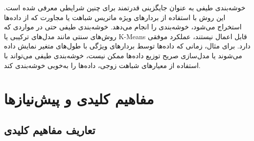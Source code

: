 \documentclass[a4paper,12pt,openany]{report}
\begin{document}
	خوشه‌بندی طیفی به عنوان جایگزینی قدرتمند برای چنین شرایطی معرفی شده است. این روش با استفاده از بردارهای ویژه ماتریس شباهت یا مجاورت که از داده‌ها استخراج می‌شود، خوشه‌بندی را انجام می‌دهد. خوشه‌بندی طیفی حتی در مواردی که روش‌های سنتی مانند مدل‌های ترکیبی یا K-Means قابل اعمال نیستند، عملکرد موفقی دارد. برای مثال، زمانی که داده‌ها توسط بردارهای ویژگی با طول‌های متغیر نمایش داده می‌شوند یا مدل‌سازی صریح توزیع داده‌ها ممکن نیست، خوشه‌بندی طیفی می‌تواند با استفاده از معیارهای شباهت زوجی، داده‌ها را به‌خوبی خوشه‌بندی کند.
	\chapter{مفاهیم کلیدی و پیش‌نیازها}
	\section{تعاریف مفاهیم کلیدی}
\end{document}
